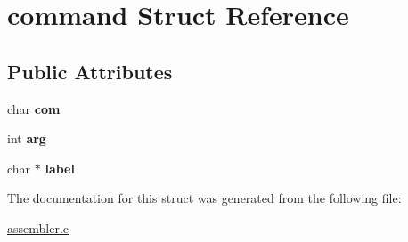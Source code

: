 \hypertarget{structcommand}{}\section{command Struct Reference}
\label{structcommand}
\subsection*{Public Attributes}
\begin{DoxyCompactItemize}
\item 
\mbox{\label{structcommand_a4836f14363acdc2b7086aa53d6ee9357}} 
char {\bfseries com}
\item 
\mbox{\label{structcommand_aec150cd271682dcc3955a2cb8dc4ca69}} 
int {\bfseries arg}
\item 
\mbox{\label{structcommand_a556cd9d8b435c0017704254f3d9a3e57}} 
char $\ast$ {\bfseries label}
\end{DoxyCompactItemize}


The documentation for this struct was generated from the following file\+:\begin{DoxyCompactItemize}
\item 
\mbox{\hyperlink{assembler_8c}{assembler.\+c}}\end{DoxyCompactItemize}
